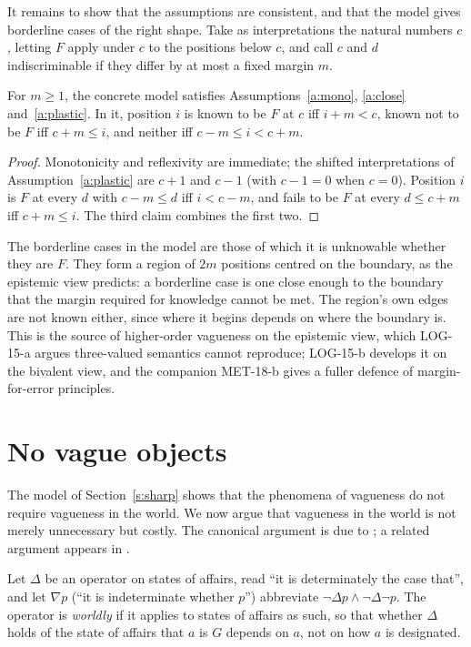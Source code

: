 \documentclass{situationist-preprint}
\begin{document}
It remains to show that the assumptions are consistent, and that the model gives borderline cases of the right shape. Take as interpretations the natural numbers $c$, letting $F$ apply under $c$ to the positions below $c$, and call $c$ and $d$ indiscriminable if they differ by at most a fixed margin $m$.

\begin{proposition}\label{p:border}
For $m \geq 1$, the concrete model satisfies Assumptions~\ref{a:mono}, \ref{a:close} and~\ref{a:plastic}. In it, position $i$ is known to be $F$ at $c$ iff $i + m < c$, known not to be $F$ iff $c + m \leq i$, and neither iff $c - m \leq i < c + m$.
\end{proposition}

\begin{proof}
Monotonicity and reflexivity are immediate; the shifted interpretations of Assumption~\ref{a:plastic} are $c + 1$ and $c - 1$ (with $c - 1 = 0$ when $c = 0$). Position $i$ is $F$ at every $d$ with $c - m \leq d$ iff $i < c - m$, and fails to be $F$ at every $d \leq c + m$ iff $c + m \leq i$. The third claim combines the first two.
\end{proof}

The borderline cases in the model are those of which it is unknowable whether they are $F$. They form a region of $2m$ positions centred on the boundary, as the epistemic view predicts: a borderline case is one close enough to the boundary that the margin required for knowledge cannot be met. The region's own edges are not known either, since where it begins depends on where the boundary is. This is the source of higher-order vagueness on the epistemic view, which LOG-15-a argues three-valued semantics cannot reproduce; LOG-15-b develops it on the bivalent view, and the companion MET-18-b gives a fuller defence of margin-for-error principles.

\section{No vague objects}\label{s:objects}

The model of Section~\ref{s:sharp} shows that the phenomena of vagueness do not require vagueness in the world. We now argue that vagueness in the world is not merely unnecessary but costly. The canonical argument is due to \citet{Evans1978}; a related argument appears in \citet{Salmon1981}.

\begin{definition}\label{d:det}
Let $\Delta$ be an operator on states of affairs, read \enquote{it is determinately the case that}, and let $\nabla p$ (\enquote{it is indeterminate whether $p$}) abbreviate $\neg \Delta p \wedge \neg \Delta \neg p$. The operator is \emph{worldly} if it applies to states of affairs as such, so that whether $\Delta$ holds of the state of affairs that $a$ is $G$ depends on $a$, not on how $a$ is designated.
\end{definition}
\end{document}
